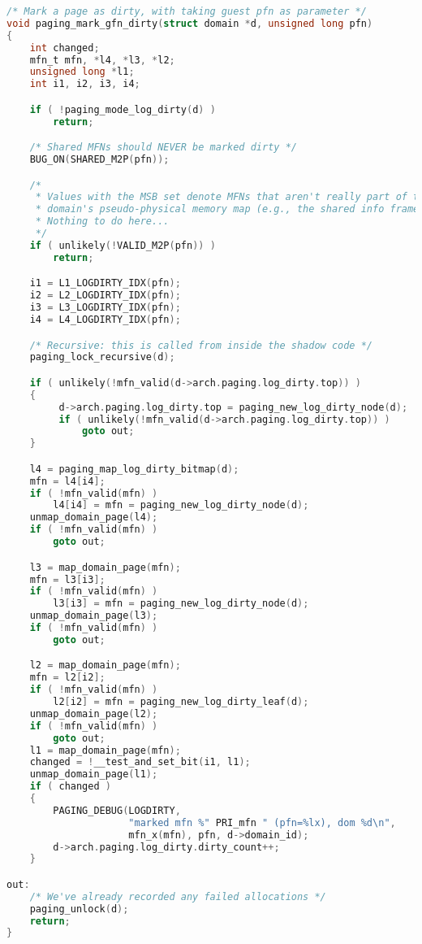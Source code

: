\begin{lstlisting}[language=C, caption=Méthode appelée lors de l'évènement \textit{pml buffer full} avant modification, label={lst:pml_buffer_full_avant}]
/* Mark a page as dirty, with taking guest pfn as parameter */
void paging_mark_gfn_dirty(struct domain *d, unsigned long pfn)
{
    int changed;
    mfn_t mfn, *l4, *l3, *l2;
    unsigned long *l1;
    int i1, i2, i3, i4;

    if ( !paging_mode_log_dirty(d) )
        return;

    /* Shared MFNs should NEVER be marked dirty */
    BUG_ON(SHARED_M2P(pfn));

    /*
     * Values with the MSB set denote MFNs that aren't really part of the
     * domain's pseudo-physical memory map (e.g., the shared info frame).
     * Nothing to do here...
     */
    if ( unlikely(!VALID_M2P(pfn)) )
        return;

    i1 = L1_LOGDIRTY_IDX(pfn);
    i2 = L2_LOGDIRTY_IDX(pfn);
    i3 = L3_LOGDIRTY_IDX(pfn);
    i4 = L4_LOGDIRTY_IDX(pfn);

    /* Recursive: this is called from inside the shadow code */
    paging_lock_recursive(d);

    if ( unlikely(!mfn_valid(d->arch.paging.log_dirty.top)) ) 
    {
         d->arch.paging.log_dirty.top = paging_new_log_dirty_node(d);
         if ( unlikely(!mfn_valid(d->arch.paging.log_dirty.top)) )
             goto out;
    }

    l4 = paging_map_log_dirty_bitmap(d);
    mfn = l4[i4];
    if ( !mfn_valid(mfn) )
        l4[i4] = mfn = paging_new_log_dirty_node(d);
    unmap_domain_page(l4);
    if ( !mfn_valid(mfn) )
        goto out;

    l3 = map_domain_page(mfn);
    mfn = l3[i3];
    if ( !mfn_valid(mfn) )
        l3[i3] = mfn = paging_new_log_dirty_node(d);
    unmap_domain_page(l3);
    if ( !mfn_valid(mfn) )
        goto out;

    l2 = map_domain_page(mfn);
    mfn = l2[i2];
    if ( !mfn_valid(mfn) )
        l2[i2] = mfn = paging_new_log_dirty_leaf(d);
    unmap_domain_page(l2);
    if ( !mfn_valid(mfn) )
        goto out;
    l1 = map_domain_page(mfn);
    changed = !__test_and_set_bit(i1, l1);
    unmap_domain_page(l1);
    if ( changed )
    {
        PAGING_DEBUG(LOGDIRTY,
                     "marked mfn %" PRI_mfn " (pfn=%lx), dom %d\n",
                     mfn_x(mfn), pfn, d->domain_id);
        d->arch.paging.log_dirty.dirty_count++;
    }

out:
    /* We've already recorded any failed allocations */
    paging_unlock(d);
    return;
}
\end{lstlisting}

